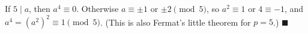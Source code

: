 If $5\mid a$, then $a^4\equiv0$. Otherwise $a\equiv\pm1$ or $\pm2\pmod5$, so $a^2\equiv1$ or $4\equiv-1$, and $a^4=(a^2)^2\equiv1\pmod5$. (This is also Fermat's little theorem for $p=5$.) $\blacksquare$
